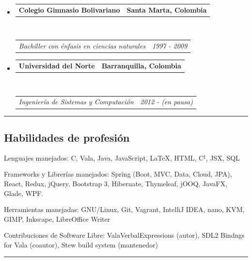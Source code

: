 \documentclass[10pt,a4paper]{article}
\makeatletter
\newenvironment{indentsection}[1]%
{\begin{list}{}%
	{\setlength{\leftmargin}{#1}}%
	\item[]%
}
{\end{list}}
\newcommand{\headerrow}[2]
{\begin{tabular*}{\linewidth}{l@{\extracolsep{\fill}}r}
	#1 &
	#2 \\
\end{tabular*}}
\makeatother
\begin{document}
\begin{itemize}
	\parskip=0.1em

	\item 
	\headerrow
		{\textbf{Colegio Gimnasio Bolivariano}}
		{\textbf{Santa Marta, Colombia}}
	\\
	\headerrow
		{\emph{Bachiller con énfasis en ciencias naturales}}
		{\emph{1997 - 2009}}

	\item 
	\headerrow
	{\textbf{Universidad del Norte}}
	{\textbf{Barranquilla, Colombia}}
	\\
	\headerrow
	{\emph{Ingeniería de Sistemas y Computación}}
	{\emph{2012 - (en pausa)}}
	

\end{itemize}


\hrule
\vspace{-0.4em}
\subsection*{Habilidades de profesión}

\begin{indentsection}{\parindent}
\begin{description*}
	\item[Lenguajes manejados:]
	C, Vala, Java, JavaScript, \LaTeX, HTML, C{$^\sharp$}, JSX, SQL
	\item[Frameworks y Librerías manejados:]
	Spring (Boot, MVC, Data, Cloud, JPA), React, Redux, jQuery, Bootstrap 3, Hibernate, Thymeleaf, jOOQ, JavaFX, Glade, WPF.
	\item[Herramientas manejadas:]
	GNU/Linux, Git, Vagrant, IntelliJ IDEA, nano, KVM, GIMP, Inkscape, LibreOffice Writer
	\item[Contribuciones de Software Libre:]
	ValaVerbalExpressions (autor), SDL2 Bindngs for Vala (coautor), Stew build system (mantenedor)
\end{description*}
\end{indentsection}
\hrule
\vspace{-0.4em}
\end{document}
